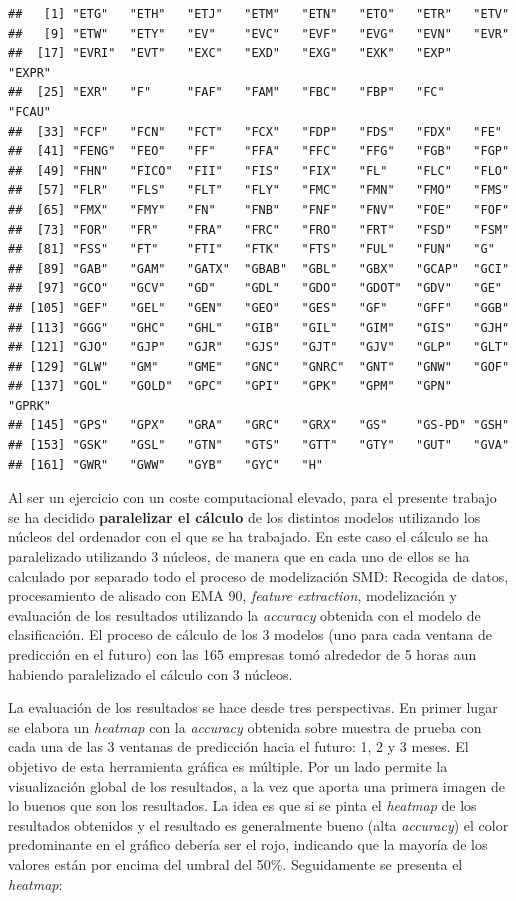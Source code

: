 \documentclass[]{DissertateUSU}
\begin{document}
\begin{verbatim}
##   [1] "ETG"   "ETH"   "ETJ"   "ETM"   "ETN"   "ETO"   "ETR"   "ETV"  
##   [9] "ETW"   "ETY"   "EV"    "EVC"   "EVF"   "EVG"   "EVN"   "EVR"  
##  [17] "EVRI"  "EVT"   "EXC"   "EXD"   "EXG"   "EXK"   "EXP"   "EXPR" 
##  [25] "EXR"   "F"     "FAF"   "FAM"   "FBC"   "FBP"   "FC"    "FCAU" 
##  [33] "FCF"   "FCN"   "FCT"   "FCX"   "FDP"   "FDS"   "FDX"   "FE"   
##  [41] "FENG"  "FEO"   "FF"    "FFA"   "FFC"   "FFG"   "FGB"   "FGP"  
##  [49] "FHN"   "FICO"  "FII"   "FIS"   "FIX"   "FL"    "FLC"   "FLO"  
##  [57] "FLR"   "FLS"   "FLT"   "FLY"   "FMC"   "FMN"   "FMO"   "FMS"  
##  [65] "FMX"   "FMY"   "FN"    "FNB"   "FNF"   "FNV"   "FOE"   "FOF"  
##  [73] "FOR"   "FR"    "FRA"   "FRC"   "FRO"   "FRT"   "FSD"   "FSM"  
##  [81] "FSS"   "FT"    "FTI"   "FTK"   "FTS"   "FUL"   "FUN"   "G"    
##  [89] "GAB"   "GAM"   "GATX"  "GBAB"  "GBL"   "GBX"   "GCAP"  "GCI"  
##  [97] "GCO"   "GCV"   "GD"    "GDL"   "GDO"   "GDOT"  "GDV"   "GE"   
## [105] "GEF"   "GEL"   "GEN"   "GEO"   "GES"   "GF"    "GFF"   "GGB"  
## [113] "GGG"   "GHC"   "GHL"   "GIB"   "GIL"   "GIM"   "GIS"   "GJH"  
## [121] "GJO"   "GJP"   "GJR"   "GJS"   "GJT"   "GJV"   "GLP"   "GLT"  
## [129] "GLW"   "GM"    "GME"   "GNC"   "GNRC"  "GNT"   "GNW"   "GOF"  
## [137] "GOL"   "GOLD"  "GPC"   "GPI"   "GPK"   "GPM"   "GPN"   "GPRK" 
## [145] "GPS"   "GPX"   "GRA"   "GRC"   "GRX"   "GS"    "GS-PD" "GSH"  
## [153] "GSK"   "GSL"   "GTN"   "GTS"   "GTT"   "GTY"   "GUT"   "GVA"  
## [161] "GWR"   "GWW"   "GYB"   "GYC"   "H"
\end{verbatim}

\noindent Al ser un ejercicio con un coste computacional elevado, para
el presente trabajo se ha decidido \textbf{paralelizar el cálculo} de
los distintos modelos utilizando los núcleos del ordenador con el que se
ha trabajado. En este caso el cálculo se ha paralelizado utilizando 3
núcleos, de manera que en cada uno de ellos se ha calculado por separado
todo el proceso de modelización SMD: Recogida de datos, procesamiento de
alisado con EMA 90, \emph{feature extraction}, modelización y evaluación
de los resultados utilizando la \emph{accuracy} obtenida con el modelo
de clasificación. El proceso de cálculo de los 3 modelos (uno para cada
ventana de predicción en el futuro) con las 165 empresas tomó alrededor
de 5 horas aun habiendo paralelizado el cálculo con 3 núcleos.

\noindent La evaluación de los resultados se hace desde tres
perspectivas. En primer lugar se elabora un \emph{heatmap} con la
\emph{accuracy} obtenida sobre muestra de prueba con cada una de las 3
ventanas de predicción hacia el futuro: 1, 2 y 3 meses. El objetivo de
esta herramienta gráfica es múltiple. Por un lado permite la
visualización global de los resultados, a la vez que aporta una primera
imagen de lo buenos que son los resultados. La idea es que si se pinta
el \emph{heatmap} de los resultados obtenidos y el resultado es
generalmente bueno (alta \emph{accuracy}) el color predominante en el
gráfico debería ser el rojo, indicando que la mayoría de los valores
están por encima del umbral del 50\%. Seguidamente se presenta el
\emph{heatmap}:
\end{document}
